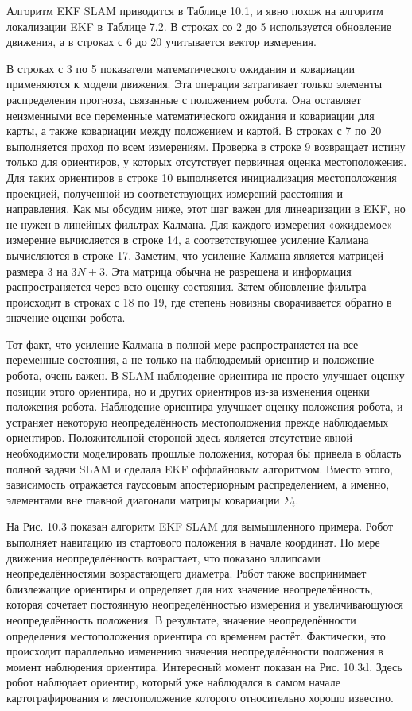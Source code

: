 \documentclass[10pt,a4paper]{article}
\begin{document}
Алгоритм EKF SLAM приводится в Таблице 10.1, и явно похож на алгоритм локализации EKF в Таблице 7.2. В строках со 2 до 5 используется обновление движения, а в строках с 6 до 20 учитывается вектор измерения. 

В строках с 3 по 5 показатели математического ожидания и ковариации применяются к модели движения. Эта операция затрагивает только элементы распределения прогноза, связанные с положением робота. Она оставляет неизменными все переменные математического ожидания и ковариации для карты, а также ковариации между положением и картой.  В строках с 7 по 20 выполняется проход по всем измерениям.  Проверка в строке 9 возвращает истину только для ориентиров, у которых отсутствует первичная оценка местоположения. Для таких ориентиров в строке 10 выполняется инициализация местоположения проекцией, полученной из соответствующих измерений расстояния и направления. Как мы обсудим ниже, этот шаг важен для линеаризации в EKF, но не нужен в линейных фильтрах Калмана. Для каждого измерения «ожидаемое» измерение вычисляется в строке 14, а соответствующее усиление Калмана вычисляются в строке 17. Заметим, что усиление Калмана является матрицей размера 3 на $3N + 3$. Эта матрица обычна не разрешена и информация распространяется через всю оценку состояния. Затем обновление фильтра происходит в строках с 18 по 19, где степень новизны сворачивается обратно в значение оценки робота.

Тот факт, что усиление Калмана в полной мере распространяется на все переменные состояния, а не только на наблюдаемый ориентир и положение робота, очень важен. В SLAM наблюдение ориентира не просто улучшает оценку позиции этого ориентира, но и других ориентиров из-за изменения оценки положения робота. Наблюдение ориентира улучшает оценку положения робота, и устраняет некоторую неопределённость местоположения прежде наблюдаемых ориентиров. Положительной стороной здесь является отсутствие явной необходимости моделировать прошлые положения, которая бы привела в область полной задачи SLAM и сделала EKF оффлайновым алгоритмом. Вместо этого, зависимость отражается гауссовым апостериорным распределением, а именно, элементами вне главной диагонали матрицы ковариации $\varSigma_t$.

На Рис. 10.3 показан алгоритм EKF SLAM для вымышленного примера. Робот выполняет навигацию из стартового положения в начале координат. По мере движения неопределённость возрастает, что показано эллипсами неопределённостями возрастающего диаметра. Робот также воспринимает близлежащие ориентиры и определяет для них значение неопределённость, которая сочетает постоянную неопределённостью измерения и увеличивающуюся неопределённость положения. В результате, значение неопределённости определения местоположения ориентира со временем растёт.  Фактически, это происходит параллельно изменению значения неопределённости положения в момент наблюдения ориентира. Интересный момент показан на Рис. 10.3d. Здесь робот наблюдает ориентир, который уже наблюдался в самом начале картографирования и местоположение которого относительно хорошо известно. 
\end{document}
